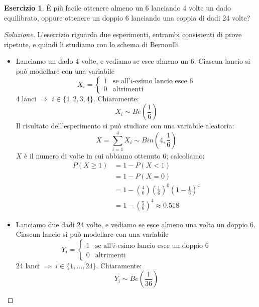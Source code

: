 \documentclass{article}
\theoremstyle{plain}
\theoremstyle{definition}
\newtheorem{esercizio}{Esercizio}[section]
\theoremstyle{remark}
\newenvironment{soluzione}
	{\renewcommand\qedsymbol{$\mathwitch*$}\begin{proof}[Soluzione]}
	{\end{proof}}
\renewcommand{\qedsymbol}{$\mathrightghost$}
\begin{document}
\begin{esercizio}
	È più facile ottenere almeno un 6 lanciando 4 volte un dado equilibrato, oppure ottenere un doppio 6 lanciando una coppia di dadi 24 volte?
	\begin{soluzione}
		L'esercizio riguarda due esperimenti, entrambi consistenti di prove ripetute, e quindi li studiamo con lo schema di Bernoulli.
		\begin{itemize}
			\item Lanciamo un dado 4 volte, e vediamo se esce almeno un 6. Ciascun lancio si può modellare con una variabile
			\begin{equation*}
				X_i=
				\begin{cases}
					1&\text{se all'$i$-esimo lancio esce 6}\\
					0&\text{altrimenti}
				\end{cases}
			\end{equation*}
			4 lanci $\Rightarrow$ $i\in\{1,2,3,4\}$. Chiaramente:
			\begin{equation*}
				X_i\sim Be\left(\frac{1}{6}\right)
			\end{equation*}
			Il risultato dell'esperimento si può studiare con una variabile aleatoria:
			\begin{equation*}
				X=\sum_{i=1}^4X_i\sim Bin\left(4,\frac{1}{6}\right)
			\end{equation*}
			$X$ è il numero di volte in cui abbiamo ottenuto 6; calcoliamo:
			\begin{align*}
				P(X\geq 1)&=1-P(X<1)\\
				&=1-P(X=0)\\
				&=1-\binom{4}{0}\left(\frac{1}{6}\right)^0\left(1-\frac{1}{6}\right)^4\\
				&=1-\left(\frac{5}{6}\right)^4\approx0.518
			\end{align*}
			\item Lanciamo due dadi 24 volte, e vediamo se esce almeno una volta un doppio 6. Ciascun lancio si può modellare con una variabile
			\begin{equation*}
				Y_i=
				\begin{cases}
					1&\text{se all'$i$-esimo lancio esce un doppio 6}\\
					0&\text{altrimenti}
				\end{cases}
			\end{equation*}
			24 lanci $\Rightarrow$ $i\in\{1,\dots, 24\}$. Chiaramente:
			\begin{equation*}
				Y_i\sim Be\left(\frac{1}{36}\right)
			\end{equation*}

\end{itemize}
\end{soluzione}
\end{esercizio}
\end{document}
